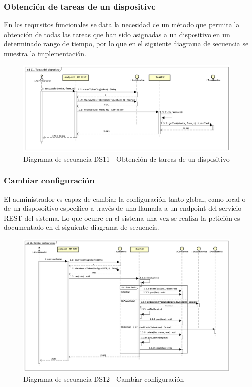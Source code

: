 \subsubsection{Obtención de tareas de un dispositivo}

En los requisitos funcionales se data la necesidad de un método que permita la obtención de todas las tareas que han sido asignadas a un dispositivo en un determinado rango de tiempo, por lo que en el siguiente diagrama de secuencia se muestra la implementación.

\begin{figure}[H]
    \centering
    \includegraphics[width=14cm]{./img/sequence/diagram/TareasDeDispositivo.png}
    \caption{Diagrama de secuencia DS11 - Obtención de tareas de un dispositivo}
    \label{fig:seq.getDeviceTasks}
\end{figure}

\newpage
\subsubsection{Cambiar configuración}

El administrador es capaz de cambiar la configuración tanto global, como local o de un disposoitivo específico a través de una llamada a un endpoint del servicio REST del sistema.
Lo que ocurre en el sistema una vez se realiza la petición es documentado en el siguiente diagrama de secuencia.

\begin{figure}[H]
    \centering
    \includegraphics[width=14cm]{./img/sequence/diagram/CambiarConfiguracion.png}
    \caption{Diagrama de secuencia DS12 - Cambiar configuración}
    \label{fig:seq.ChangeConf}
\end{figure}

